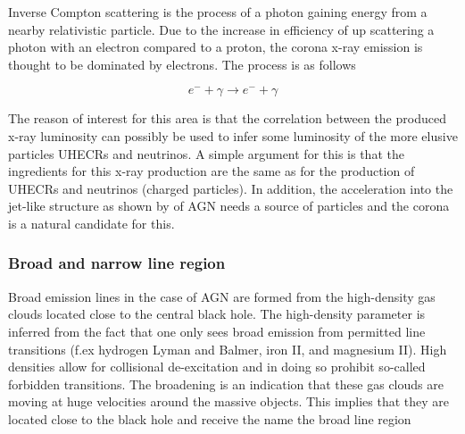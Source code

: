 Inverse Compton scattering is the process of a photon gaining energy from a nearby relativistic particle. Due to the increase in efficiency 
of up scattering a photon with an electron compared to a proton, the corona x-ray emission is thought to be dominated by electrons. The process is as follows

\begin{equation}
    e^- + \gamma \rightarrow e^- + \gamma 
\end{equation}

The reason of interest for this area is that the correlation between the produced x-ray luminosity can possibly be used to infer some luminosity of the more elusive 
particles UHECRs and neutrinos. A simple argument for this is that the ingredients for this x-ray production are the same as for the production of UHECRs and neutrinos (charged particles). In addition, 
the acceleration into the jet-like structure as shown by of AGN needs a source of particles and the corona is a natural candidate for this.









\subsubsection{Broad and narrow line region}

Broad emission lines in the case of AGN are formed from the high-density gas clouds located close to the central black hole. The 
high-density parameter is inferred from the fact that one only sees broad emission from permitted line transitions (f.ex hydrogen Lyman and Balmer,
iron II, and magnesium II). High densities allow for collisional de-excitation and in doing so prohibit so-called forbidden transitions.
The broadening is an indication that these gas clouds are moving at huge velocities around the massive objects. This implies that they are located close to the black hole and receive the name the broad line region

